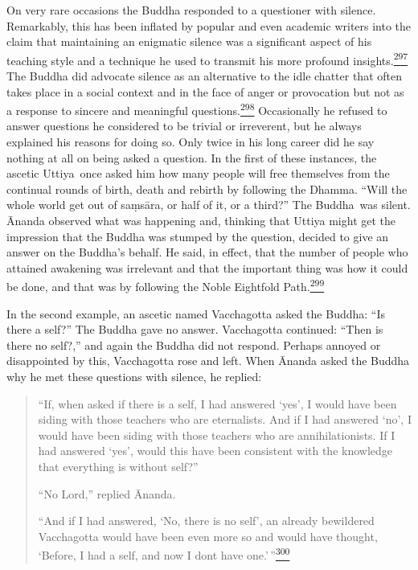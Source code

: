 On very rare occasions the Buddha responded to a questioner with
silence. Remarkably, this has been inflated by popular and even academic
writers into the claim that maintaining an enigmatic silence was a
significant aspect of his teaching style and a technique he used to
transmit his more profound
insights.\label{footprints_split_010.html_fnref297}\hyperref[footprints_split_024.htmlux5cux23fn297]{\textsuperscript{297}}
The Buddha did advocate silence as an alternative to the idle chatter
that often takes place in a social context and in the face of anger or
provocation but not as a response to sincere and meaningful
questions.\label{footprints_split_010.html_fnref298}\hyperref[footprints_split_024.htmlux5cux23fn298]{\textsuperscript{298}}
Occasionally he refused to answer questions he considered to be trivial
or irreverent, but he always explained his reasons for doing so. Only
twice in his long career did he say nothing at all on being asked a
question. In the first of these instances, the ascetic Uttiya~once asked
him how many people will free themselves from the continual rounds of
birth, death and rebirth by following the Dhamma. ``Will the whole world
get out of saṃsāra, or half of it, or a third?'' The Buddha~was silent.
Ānanda observed what was happening and, thinking that Uttiya might get
the impression that the Buddha was stumped by the question, decided to
give an answer on the Buddha's behalf. He said, in effect, that the
number of people who attained awakening was irrelevant and that the
important thing was how it could be done, and that was by following the
Noble Eightfold
Path.\label{footprints_split_010.html_fnref299}\hyperref[footprints_split_024.htmlux5cux23fn299]{\textsuperscript{299}}

In the second example, an ascetic named Vacchagotta asked the Buddha:
``Is there a self?'' The Buddha gave no answer. Vacchagotta continued:
``Then is there no self?,'' and again the Buddha did not respond.
Perhaps annoyed or disappointed by this, Vacchagotta rose and left. When
Ānanda asked the Buddha why he met these questions with silence, he
replied:

\begin{quote}
``If, when asked if there is a self, I had answered `yes', I would have
been siding with those teachers who are eternalists. And if I had
answered `no', I would have been siding with those teachers who are
annihilationists. If I had answered `yes', would this have been
consistent with the knowledge that everything is without self?''

``No Lord,'' replied Ānanda.

``And if I had answered, `No, there is no self', an already bewildered
Vacchagotta would have been even more so and would have thought,
`Before, I had a self, and now I don\textquotesingle t have
one.'\,''\label{footprints_split_010.html_fnref300}\hyperref[footprints_split_024.htmlux5cux23fn300]{\textsuperscript{300}}
\end{quote}

